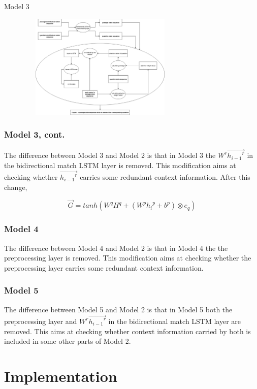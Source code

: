\documentclass{beamer}
\begin{document}
\begin{frame}{Model 3}
    \begin{center}
        \includegraphics[width=10cm, height=5cm]{figures/model3_encoder.png}
    \end{center}
\end{frame}

\begin{frame} \frametitle{Model 3, cont.}
    The difference between Model 3 and Model 2 is that in Model 3 the $W^r\overrightarrow{{h_{i-1}}^r}$ in the bidirectional match LSTM layer is removed. This modification aims at checking whether $\overrightarrow{{h_{i-1}}^r}$ carries some redundant context information. After this change,


    $$\overrightarrow{G} = tanh(W^qH^q + (W^p{h_i}^p + b^p) \otimes e_q)$$
\end{frame}

\begin{frame} \frametitle{Model 4}
    The difference between Model 4 and Model 2 is that in Model 4 the the preprocessing layer is removed. This modification aims at checking whether the preprocessing layer carries some redundant context information.
\end{frame}

\begin{frame} \frametitle{Model 5}
    The difference between Model 5 and Model 2 is that in Model 5 both the preprocessing layer and $W^r\overrightarrow{{h_{i-1}}^r}$ in the bidirectional match LSTM layer are removed. This aims at checking whether context information carried by both is included in some other parts of Model 2.
\end{frame}

\section{Implementation}
\end{document}
